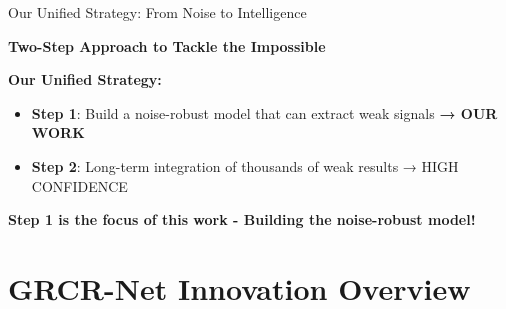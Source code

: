 \documentclass[aspectratio=169]{beamer}
\begin{document}
\begin{frame}{Our Unified Strategy: From Noise to Intelligence}
\begin{center}
\textcolor{zjutblue}{\Large \textbf{Two-Step Approach to Tackle the Impossible}}
\end{center}

\vspace{0.4cm}

\textbf{\textcolor{zjutblue}{Our Unified Strategy:}}
\begin{itemize}
\setlength{\itemsep}{0.2cm}
\item \textbf{\textcolor{zjutred}{Step 1}}: Build a noise-robust model that can extract weak signals \textcolor{zjutred}{\textbf{→ OUR WORK}}
\item \textbf{\textcolor{zjutred}{Step 2}}: Long-term integration of thousands of weak results → HIGH CONFIDENCE
\end{itemize}

\vspace{0.4cm}

\begin{center}
\end{center}

\vspace{0.3cm}

\begin{center}
\textcolor{zjutred}{\large \textbf{Step 1 is the focus of this work - Building the noise-robust model!}}
\end{center}
\end{frame}



\section{GRCR-Net Innovation Overview}
\end{document}
